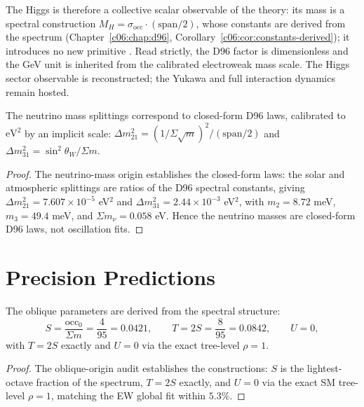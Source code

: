 The Higgs is therefore a collective scalar observable of the theory: its mass is a spectral
construction $M_H = \sigma_{\mathrm{occ}}\cdot(\mathrm{span}/2)$, whose constants are
derived from the spectrum (Chapter~\ref{c06:chap:d96},
Corollary~\ref{c06:cor:constants-derived}); it introduces no new primitive \cite{c11:QG169}.
Read strictly, the D96 factor is dimensionless and the GeV unit is inherited from the
calibrated electroweak mass scale. The Higgs sector observable is reconstructed; the Yukawa
and full interaction dynamics remain hosted.

\begin{lemma}
\label{c11:lem:neutrino-masses}
The neutrino mass splittings correspond to closed-form D96 laws, calibrated to
$\mathrm{eV}^2$ by an implicit scale:
$\Delta m^2_{21} = (1/\Sigma\sqrt{m})^2/(\mathrm{span}/2)$ and
$\Delta m^2_{31} = \sin^2\theta_W/\Sigma m$.
\end{lemma}

\begin{proof}
The neutrino-mass origin \cite{c11:QG172} establishes the closed-form laws: the solar and
atmospheric splittings are ratios of the D96 spectral constants, giving
$\Delta m^2_{21} = 7.607\times10^{-5}$ eV$^2$ and
$\Delta m^2_{31} = 2.44\times10^{-3}$ eV$^2$, with $m_2 = 8.72$ meV,
$m_3 = 49.4$ meV, and $\Sigma m_\nu = 0.058$ eV. Hence the neutrino masses are closed-form
D96 laws, not oscillation fits.
\end{proof}

\section{Precision Predictions}
\label{c11:sec:precision}

\begin{theorem}
\label{c11:thm:oblique}
The oblique parameters are derived from the spectral structure:
\begin{equation}
\label{c11:eq:oblique}
S = \frac{\mathrm{occ}_0}{\Sigma m} = \frac{4}{95} = 0.0421,
\qquad
T = 2S = \frac{8}{95} = 0.0842,
\qquad
U = 0,
\end{equation}
with $T = 2S$ exactly and $U = 0$ via the exact tree-level $\rho = 1$.
\end{theorem}

\begin{proof}
The oblique-origin audit \cite{c11:QG180} establishes the constructions: $S$ is the lightest-
octave fraction of the spectrum, $T = 2S$ exactly, and $U = 0$ via the exact SM tree-level
$\rho = 1$, matching the EW global fit within $5.3\%$.
\end{proof}

